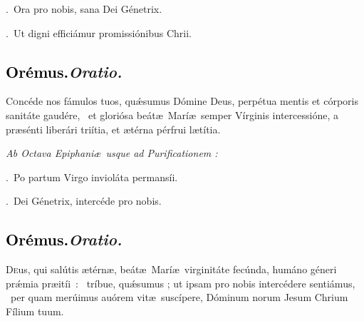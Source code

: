 \documentclass[12pt]{article} %
\newenvironment{rubric}{\vspace{1 mm}\color{benred8} \itshape \leftskip 0in \setlength{\parindent}{0.25in}}{\vspace{1 mm}}
\newenvironment{response}{\leftskip 0in \setlength{\parindent}{0in}}{\vspace{1 mm}}
\let\oldgresixstar\gresixstar
\renewcommand{\gresixstar}{\textcolor{benred8}{\oldgresixstar}}
\let\oldgredagger\gredagger
\renewcommand{\gredagger}{\textcolor{benred8}{\oldgredagger}}
\let\oldVbar\Vbar
\renewcommand{\Vbar}{\textcolor{benred8}{\oldVbar .}}
\let\oldRbar\Rbar
\renewcommand{\Rbar}{\textcolor{benred8}{\oldRbar .}}
\def\capitulumSpace{\hspace{20 mm}}
\begin{document}
\begin{response}
\Vbar\ Ora pro nobis, sana Dei G\'{e}netrix.

\Rbar\ Ut digni effici\'{a}mur promissi\'{o}nibus Chrii.

\end{response}

\subsection*{\textcolor{black}{Or\'{e}mus.}\capitulumSpace \emph{Oratio.}}

\begin{response}\lettrine{C}{o}nc\'{e}de nos f\'{a}mulos tuos, qu\'{\ae}sumus D\'{o}mine Deus, perp\'{e}tua mentis et c\'{o}rporis sanit\'{a}te gaud\'{e}re, \gresixstar\ et glori\'{o}sa be\'{a}t\ae\ Mar\'{i}\ae\ semper V\'{i}rginis intercessi\'{o}ne, a pr\ae s\'{e}nti liber\'{a}ri tri\'{i}tia, et \ae t\'{e}rna p\'{e}rfrui l\ae t\'{i}tia.

\end{response}

\begin{rubric}
Ab Octava Epiphani\ae\ usque ad Purificationem :

\end{rubric}

\begin{response}
\Vbar\ Po partum Virgo inviol\'{a}ta permans\'{i}i.

\Rbar\ Dei G\'{e}netrix, interc\'{e}de pro nobis.

\end{response}

\subsection*{\textcolor{black}{Or\'{e}mus.}\capitulumSpace \emph{Oratio.}}

\begin{response}\lettrine{D}{e}us, qui sal\'{u}tis \ae t\'{e}rn\ae , be\'{a}t\ae\ Mar\'{i}\ae\ virginit\'{a}te fec\'{u}nda, hum\'{a}no g\'{e}neri pr\'{\ae}mia \mbox{pr\ae{}it\'{i}i : \gredagger} tr\'{i}bue, qu\'{\ae}sumus ; ut ipsam pro nobis interc\'{e}dere senti\'{a}mus, \gresixstar\ per quam mer\'{u}imus au\'{o}rem vit\ae\ susc\'{i}pere, D\'{o}minum norum Jesum Chrium F\'{i}lium tuum.

\end{response}
\end{document}
